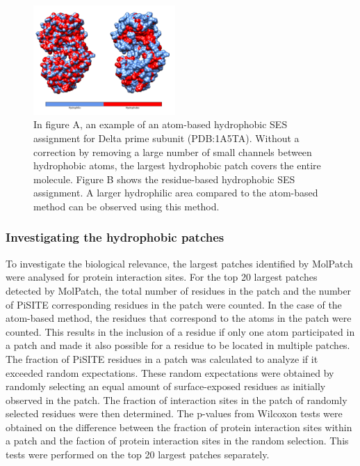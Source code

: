 \documentclass[11pt,a4paper]{article}
\begin{document}
\begin{figure}[h!]
  \centering
  \includegraphics[width=0.48\textwidth]{figures/fig4.png}
  \caption{In figure A, an example of an atom-based hydrophobic SES assignment for Delta prime subunit (PDB:1A5TA). Without a correction by removing a large number of small channels between hydrophobic atoms, the largest hydrophobic patch covers the entire molecule. Figure B shows the residue-based hydrophobic SES assignment. A larger hydrophilic area compared to the atom-based method can be observed using this method.}
  \label{fig4}
\end{figure}

\subsubsection{Investigating the hydrophobic patches}
To investigate the biological relevance, the largest patches identified by MolPatch were analysed for protein interaction sites. For the top 20 largest patches detected by MolPatch, the total number of residues in the patch and the number of PiSITE corresponding residues in the patch were counted. In the case of the atom-based method, the residues that correspond to the atoms in the patch were counted. This results in the inclusion of a residue if only one atom participated in a patch and made it also possible for a residue to be located in multiple patches. The fraction of PiSITE residues in a patch was calculated to analyze if it exceeded random expectations. These random expectations were obtained by randomly selecting an equal amount of surface-exposed residues as initially observed in the patch. The fraction of interaction sites in the patch of randomly selected residues were then determined. The p-values from Wilcoxon tests were obtained on the difference between the fraction of protein interaction sites within a patch and the faction of protein interaction sites in the random selection. This tests were performed on the top 20 largest patches separately.
\end{document}
